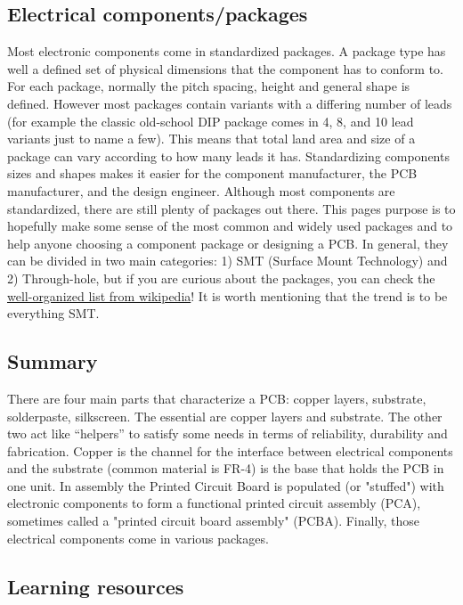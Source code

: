 \documentclass[final]{cubedoc}
\begin{document}
	\subsection{Electrical components/packages}
	
	Most electronic components come in standardized packages. A package type has well a defined set of physical dimensions that the component has to conform to. For each package, normally the pitch spacing, height and general shape is defined. However most packages contain variants with a differing number of leads (for example the classic old-school DIP package comes in 4, 8, and 10 lead variants just to name a few). This means that total land area and size of a package can vary according to how many leads it has.
	Standardizing components sizes and shapes makes it easier for the component manufacturer, the PCB manufacturer, and the design engineer. Although most components are standardized, there are still plenty of packages out there. This pages purpose is to hopefully make some sense of the most common and widely used packages and to help anyone choosing a component package or designing a PCB.
	In general, they can be divided in two main categories: 1) SMT (Surface Mount Technology) and 2) Through-hole, but if you are curious about the packages, you can check the \href{https://en.wikipedia.org/wiki/List_of_integrated_circuit_packaging_types}{well-organized list from wikipedia}! It is worth mentioning that the trend is to be everything SMT.
	
	
	\subsection{Summary}
	
	There are four main parts that characterize a PCB: copper layers, substrate, solderpaste, silkscreen. The essential are copper layers and substrate. The other two act like “helpers” to satisfy some needs in terms of reliability, durability and fabrication. Copper is the channel for the interface between electrical components and the substrate (common material is FR-4) is the base that holds the PCB in one unit. In assembly the Printed Circuit Board is populated (or "stuffed") with electronic components to form a functional printed circuit assembly (PCA), sometimes called a "printed circuit board assembly" (PCBA). Finally, those electrical components come in various packages.
	
	\subsection{Learning resources} %
	
\end{document}
